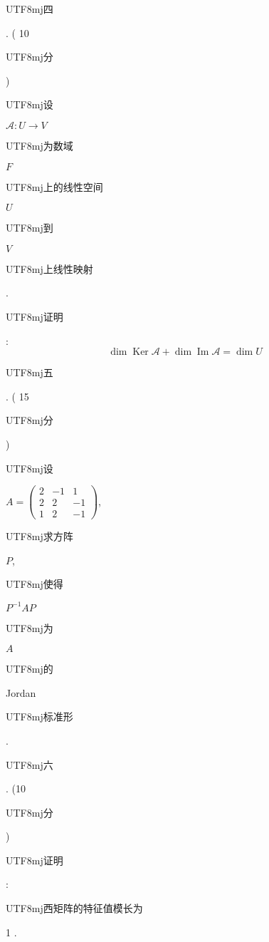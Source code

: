 \documentclass[10pt]{article}
\begin{document}
\begin{CJK}{UTF8}{mj}四\end{CJK}. ( 10 \begin{CJK}{UTF8}{mj}分\end{CJK}) \begin{CJK}{UTF8}{mj}设\end{CJK} $\mathscr{A}: U \rightarrow V$ \begin{CJK}{UTF8}{mj}为数域\end{CJK} $F$ \begin{CJK}{UTF8}{mj}上的线性空间\end{CJK} $U$ \begin{CJK}{UTF8}{mj}到\end{CJK} $V$ \begin{CJK}{UTF8}{mj}上线性映射\end{CJK}. \begin{CJK}{UTF8}{mj}证明\end{CJK}:
$$
\operatorname{dim} \operatorname{Ker} \mathscr{A}+\operatorname{dim} \operatorname{Im} \mathscr{A}=\operatorname{dim} U
$$
\begin{CJK}{UTF8}{mj}五\end{CJK}. ( 15 \begin{CJK}{UTF8}{mj}分\end{CJK}) \begin{CJK}{UTF8}{mj}设\end{CJK} $A=\left(\begin{array}{ccc}2 & -1 & 1 \\ 2 & 2 & -1 \\ 1 & 2 & -1\end{array}\right)$, \begin{CJK}{UTF8}{mj}求方阵\end{CJK} $P$, \begin{CJK}{UTF8}{mj}使得\end{CJK} $P^{-1} A P$ \begin{CJK}{UTF8}{mj}为\end{CJK} $A$ \begin{CJK}{UTF8}{mj}的\end{CJK} Jordan \begin{CJK}{UTF8}{mj}标准形\end{CJK}.

\begin{CJK}{UTF8}{mj}六\end{CJK}. (10 \begin{CJK}{UTF8}{mj}分\end{CJK}) \begin{CJK}{UTF8}{mj}证明\end{CJK}: \begin{CJK}{UTF8}{mj}西矩阵的特征值模长为\end{CJK} 1 .
\end{document}
